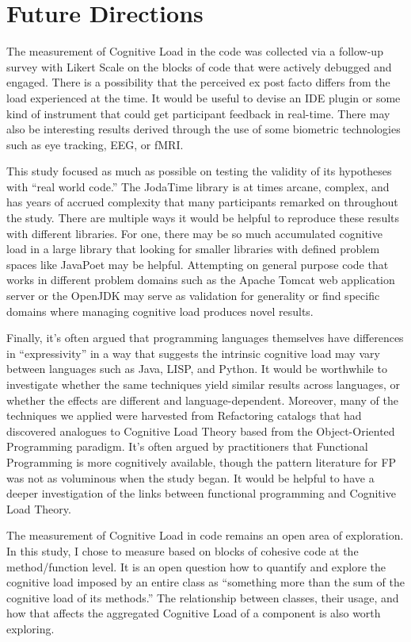 \chapter{Future Directions}

The measurement of Cognitive Load in the code was collected via a follow-up survey with Likert Scale on the blocks of code that were actively debugged and engaged. There is a possibility that the perceived ex post facto differs from the load experienced at the time. It would be useful to devise an IDE plugin or some kind of instrument that could get participant feedback in real-time. There may also be interesting results derived through the use of some biometric technologies such as eye tracking, EEG, or fMRI.  

This study focused as much as possible on testing the validity of its hypotheses with “real world code.” The JodaTime library is at times arcane, complex, and has years of accrued complexity that many participants remarked on throughout the study. There are multiple ways it would be helpful to reproduce these results with different libraries. For one, there may be so much accumulated cognitive load in a large library that looking for smaller libraries with defined problem spaces like JavaPoet may be helpful. Attempting on general purpose code that works in different problem domains such as the Apache Tomcat web application server or the OpenJDK may serve as validation for generality or find specific domains where managing cognitive load produces novel results.  

Finally, it’s often argued that programming languages themselves have differences in “expressivity” \cite{Grahm2001} in a way that suggests the intrinsic cognitive load may vary between languages such as Java, LISP, and Python. It would be worthwhile to investigate whether the same techniques yield similar results across languages, or whether the effects are different and language-dependent. Moreover, many of the techniques we applied were harvested from Refactoring catalogs that had discovered analogues to Cognitive Load Theory based from the Object-Oriented Programming paradigm. It’s often argued by practitioners that Functional Programming is more cognitively available, though the pattern literature for FP was not as voluminous when the study began. It would be helpful to have a deeper investigation of the links between functional programming and Cognitive Load Theory.

The measurement of Cognitive Load in code remains an open area of exploration. In this study, I chose to measure based on blocks of cohesive code at the method/function level. It is an open question how to quantify and explore the cognitive load imposed by an entire class as “something more than the sum of the cognitive load of its methods.” The relationship between classes, their usage, and how that affects the aggregated Cognitive Load of a component is also worth exploring. 


